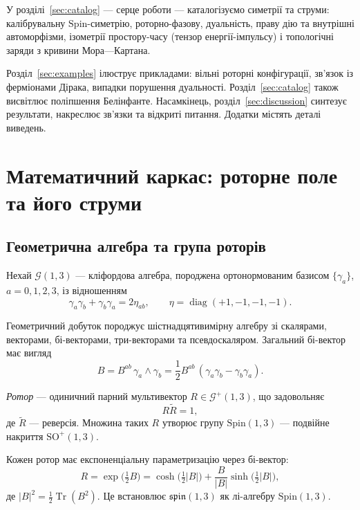 \documentclass[11pt,a4paper]{article}
\numberwithin{equation}{section}
\theoremstyle{plain}
\theoremstyle{definition}
\theoremstyle{remark}
\DeclareMathOperator{\Tr}{Tr}
\DeclareMathOperator{\diag}{diag}
\begin{document}
У розділі~\ref{sec:catalog} — серце роботи — каталогізуємо симетрії та струми: калібрувальну $\mathrm{Spin}$-симетрію, роторно-фазову, дуальність, праву дію та внутрішні автоморфізми, ізометрії простору-часу (тензор енергії-імпульсу) і топологічні заряди з кривини Мора—Картана.

Розділ~\ref{sec:examples} ілюструє прикладами: вільні роторні конфігурації, зв'язок із ферміонами Дірака, випадки порушення дуальності. Розділ~\ref{sec:catalog} також висвітлює поліпшення Белінфанте. Насамкінець, розділ~\ref{sec:discussion} синтезує результати, накреслює зв'язки та відкриті питання. Додатки містять деталі виведень.

\section{Математичний каркас: роторне поле та його струми}
\label{sec:setup}

\subsection{Геометрична алгебра та група роторів}

Нехай $\mathcal{G}(1,3)$ — кліфордова алгебра, породжена ортонормованим базисом $\{\gamma_a\}$, $a=0,1,2,3$, із відношенням
\begin{equation}
\gamma_a\gamma_b+\gamma_b\gamma_a=2\eta_{ab}, \qquad \eta=\diag(+1,-1,-1,-1).
\end{equation}

Геометричний добуток породжує шістнадцятивимірну алгебру зі скалярами, векторами, бі-векторами, три-векторами та псевдоскаляром. Загальний бі-вектор має вигляд
\begin{equation}
B = B^{ab}\,\gamma_a\wedge\gamma_b = \frac{1}{2}B^{ab}\,(\gamma_a\gamma_b - \gamma_b\gamma_a).
\end{equation}

\emph{Ротор} — одиничний парний мультивектор $R \in \mathcal{G}^+(1,3)$, що задовольняє
\begin{equation}
R\widetilde{R} = 1,
\end{equation}
де $\widetilde{R}$ — реверсія. Множина таких $R$ утворює групу $\mathrm{Spin}(1,3)$ — подвійне накриття $\mathrm{SO}^+(1,3)$.

Кожен ротор має експоненціальну параметризацію через бі-вектор:
\begin{equation}
R = \exp\!\big(\tfrac{1}{2}B\big) = \cosh\!\big(\tfrac{1}{2}|B|\big) + \frac{B}{|B|}\sinh\!\big(\tfrac{1}{2}|B|\big),
\end{equation}
де $|B|^2 = \frac{1}{2}\Tr(B^2)$. Це встановлює $\mathfrak{spin}(1,3)$ як лі-алгебру $\mathrm{Spin}(1,3)$.
\end{document}

